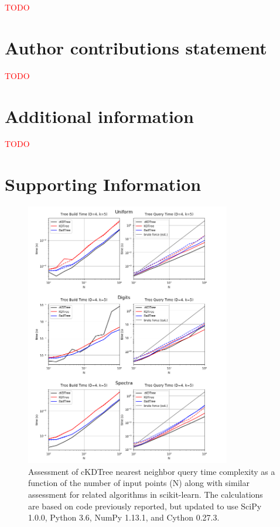 \documentclass[fleqn,10pt]{wlscirep}
\newcommand{\fixme}[1]{\textcolor{red}{{#1}}}
\begin{document}
\fixme{TODO}


\section*{Author contributions statement}

\fixme{TODO}


\section*{Additional information}

\fixme{TODO}

\section*{Supporting Information}

\renewcommand{\thefigure}{S\arabic{figure}}
\setcounter{figure}{0}

\begin{figure}[H]
\centering
\includegraphics[width=0.8\textwidth]{supporting_info/knn_complexity_confirm}
\caption{Assessment of cKDTree nearest neighbor query time complexity as a function of the number of input points (N) along with similar assessment for related algorithms in scikit-learn. The calculations are based on code previously reported\cite{knn-jake}, but updated to use SciPy 1.0.0, Python 3.6, NumPy 1.13.1, and Cython 0.27.3.}
\label{fig:knn-complexity}
\end{figure}
\end{document}
